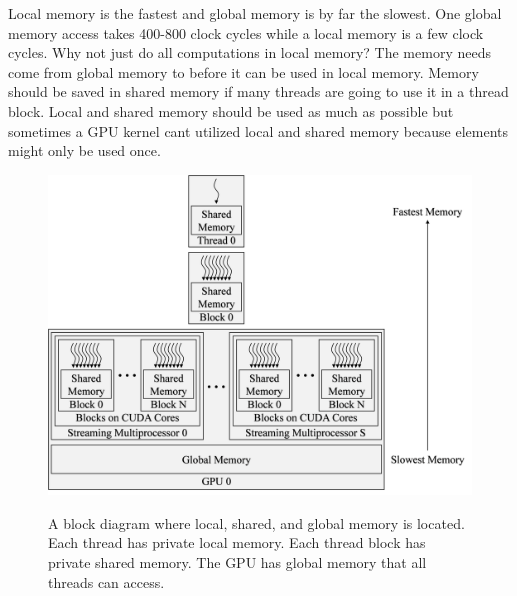 Local memory is the fastest and global memory is by far the slowest.
One global memory access takes 400-800 clock cycles while a local memory is a few clock cycles.
Why not just do all computations in local memory?
The memory needs come from global memory to before it can be used in local memory.
Memory should be saved in shared memory if many threads are going to use it in a thread block.
Local and shared memory should be used as much as possible but sometimes a GPU kernel cant utilized local and shared memory because elements might only be used once.
\begin{figure}
	\caption{A block diagram where local, shared, and global memory is located. Each thread has private local memory. Each thread block has private shared memory. The GPU has global memory that all threads can access.}
	\centering\includegraphics[width=9.83in/100*55]{figures/gpu_intro/fullGPUmemBlockDiagram.pdf}
	\label{fig:fullGPUmemBlockDiagram}
\end{figure}

